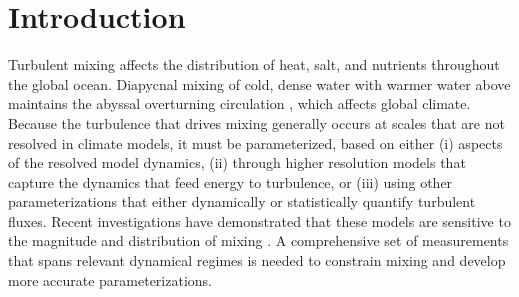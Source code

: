 \documentclass{ametsoc}
\begin{document}


\section{Introduction}

Turbulent mixing affects the distribution of heat, salt, and nutrients throughout the global ocean. Diapycnal mixing  of cold, dense water with warmer water above maintains the abyssal overturning circulation \citep{munk66,munkwunsch98}, which affects global climate. Because the turbulence that drives mixing generally occurs at scales that are not resolved in climate models, it must be parameterized, based on either (i) aspects of the resolved model dynamics, (ii) through higher resolution models that capture the dynamics that feed energy to turbulence, or (iii) using other parameterizations that either dynamically or statistically quantify turbulent fluxes. Recent investigations have demonstrated that these models are sensitive to the magnitude and distribution of mixing \citep{meletetal13}. A comprehensive set of measurements that spans relevant dynamical regimes is needed to constrain mixing and develop more accurate parameterizations.
\end{document}
